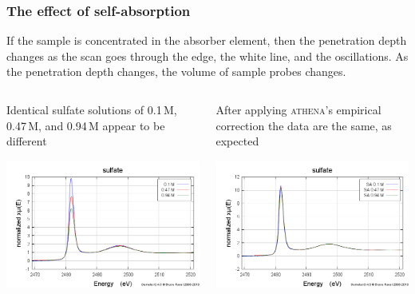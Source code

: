 \documentclass[10pt, xcolor=x11names, compress]{beamer}
\begin{document}
\begin{frame}
  \frametitle{The effect of self-absorption}
  If the sample is concentrated in the absorber element, then the
  penetration depth changes as the scan goes through the edge, the
  white line, and the oscillations.  As the penetration depth changes,
  the volume of sample probes changes.

  \medskip

  \begin{columns}
    \begin{column}{0.5\linewidth}
      Identical sulfate solutions of 0.1\,M, 0.47\,M, and 0.94\,M
      appear to be different

      \includegraphics[width=0.9\linewidth]{sample/sulfate.png}      
    \end{column}
    \begin{column}{0.5\linewidth}
      After applying \textsc{athena}'s empirical correction the data
      are the same, as expected

      \includegraphics[width=0.9\linewidth]{sample/sacorr.png}      
    \end{column}
  \end{columns}
\end{frame}
\end{document}
